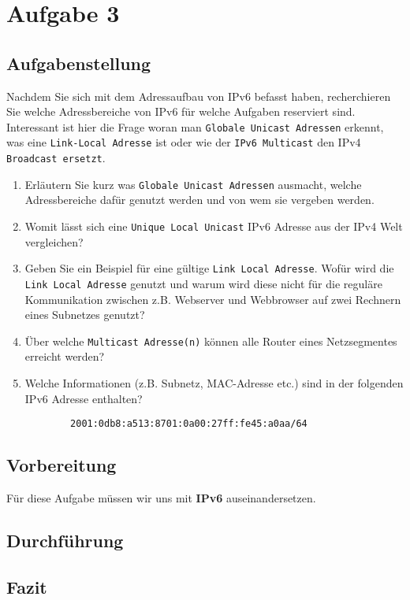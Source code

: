 \newpage

\section{Aufgabe 3}

\subsection{Aufgabenstellung}
Nachdem Sie sich mit dem Adressaufbau von IPv6 befasst haben, recherchieren Sie welche Adressbereiche von IPv6 für welche Aufgaben reserviert sind. Interessant ist hier die Frage woran man \texttt{Globale Unicast Adressen} erkennt, was eine \texttt{Link-Local Adresse} ist oder wie der \texttt{IPv6 Multicast} den IPv4 \texttt{Broadcast ersetzt}.

\begin{enumerate}[label=(\alph*)]
	\item Erläutern Sie kurz was \texttt{Globale Unicast Adressen} ausmacht, welche Adressbereiche dafür genutzt werden und von wem sie vergeben werden.
	\item Womit lässt sich eine \texttt{Unique Local Unicast} IPv6 Adresse aus der IPv4 Welt vergleichen?
	\item Geben Sie ein Beispiel für eine gültige  \texttt{Link Local Adresse}. Wofür wird die  \texttt{Link Local Adresse} genutzt und warum wird diese nicht für die reguläre Kommunikation zwischen z.B. Webserver und Webbrowser auf zwei Rechnern eines Subnetzes genutzt?
	\item Über welche \texttt{Multicast Adresse(n)} können alle Router eines Netzsegmentes erreicht werden?
	\item Welche Informationen (z.B. Subnetz, MAC-Adresse etc.) sind in der folgenden IPv6 Adresse enthalten?
\begin{lstlisting}
		2001:0db8:a513:8701:0a00:27ff:fe45:a0aa/64
\end{lstlisting}
\end{enumerate}

\subsection{Vorbereitung}
Für diese Aufgabe müssen wir uns mit \textbf{IPv6} auseinandersetzen.

\subsection{Durchführung}

\subsection{Fazit}